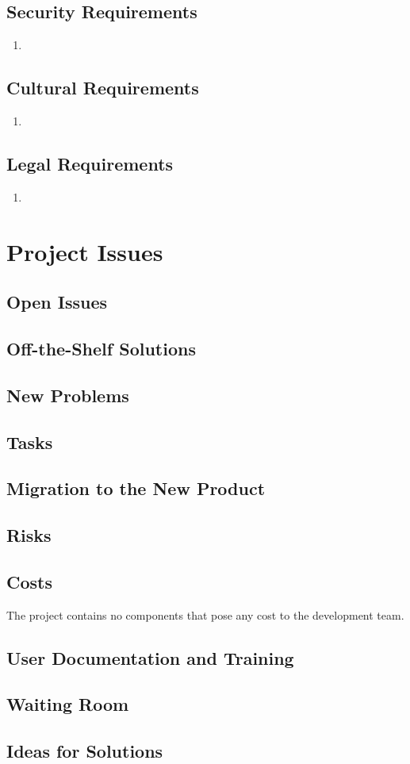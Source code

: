 \documentclass{article}
\begin{document}
\subsection{Security Requirements}
\begin{enumerate}
\item
\end{enumerate}
\subsection{Cultural Requirements}
\begin{enumerate}
\item
\end{enumerate}
\subsection{Legal Requirements}
\begin{enumerate}
\item
\end{enumerate}

\section{Project Issues}

\subsection{Open Issues }
\subsection{Off-the-Shelf Solutions}
\subsection{New Problems}
\subsection{Tasks}
\subsection{Migration to the New Product}
\subsection{Risks}
\subsection{Costs}
The project contains no components that pose any cost to the development team.
\subsection{User Documentation and Training}
\subsection{Waiting Room}
\subsection{Ideas for Solutions}
\end{document}
